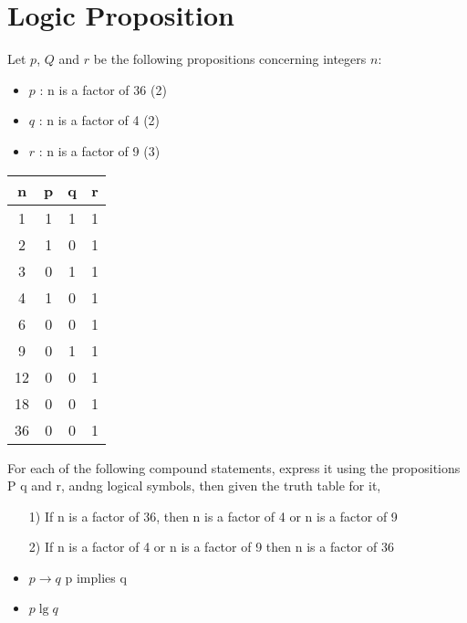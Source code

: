 \documentclass[]{report}
\begin{document}

\section{Logic Proposition}
Let $p$, $Q$ and $r$ be the following propositions concerning integers $n$:

\begin{itemize}
\item $p$ : n is a factor of 36 (2)
\item $q$ : n is a factor of 4 (2)
\item $r$ : n is a factor of 9 (3)
\end{itemize}

{

\begin{center}
\begin{tabular}{|c||c|c|c|}
\hline 
\phantom{spa} \textbf{n} \phantom{spa}& \phantom{spa}\textbf{p} \phantom{spa}& \phantom{spa}\textbf{q} \phantom{spa}& \phantom{spa}\textbf{r} \phantom{spa}\\ \hline \hline
1&1&1&1\\ \hline
2&1&0&1\\ \hline
3&0&1&1\\ \hline
4&1&0&1\\ \hline
6&0&0&1\\ \hline
9&0&1&1\\ \hline
12&0&0&1\\ \hline
18&0&0&1\\ \hline
36&0&0&1\\
\hline 
\end{tabular} 
\end{center}
}
For each of the following compound statements, express it using the propositions P q and r, andng logical symbols, then given the truth table for it,

\begin{itemize}
\item[1)] If n is a factor of 36, then n is a factor of 4 or n is a factor of 9
\item[2)] If n is a factor of 4 or n is a factor of 9 then  n is a factor of 36
\end{itemize}

\newpage
\begin{itemize}
	\item $ p \rightarrow q$  p implies q
	\item $p \lg q $
\end{itemize}
\newpage
\end{document}
